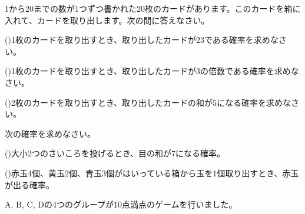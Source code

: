 \documentclass[
  12pt,a4paper,lualatex,ja=standard]{bxjsarticle}
\begin{document}
\begin{flushleft}
\vspace{10mm}

\vfill

\setcounter{skaunta}{0}

\noindent{} \hspace{1pt}1から20までの数が1つずつ書かれた20枚のカードがあります。このカードを箱に入れて、カードを取り出します。次の問に答えなさい。

()\hspace{2.5pt}1枚のカードを取り出すとき、取り出したカードが23である確率を求めなさい。

\vspace{10mm}

()\hspace{2.5pt}1枚のカードを取り出すとき、取り出したカードが3の倍数である確率を求めなさい。

\vspace{10mm}

()\hspace{2.5pt}2枚のカードを取り出すとき、取り出したカードの和が5になる確率を求めなさい。

\vspace{10mm}

\vfill

\setcounter{skaunta}{0}

\noindent{} \hspace{1pt}次の確率を求めなさい。

()\hspace{2.5pt}大小2つのさいころを投げるとき、目の和が7になる確率。

\vspace{10mm}

()\hspace{2.5pt}赤玉4個、黄玉2個、青玉3個がはいっている箱から玉を1個取り出すとき、赤玉が出る確率。

\vspace{10mm}

\vfill
\newpage

\setcounter{skaunta}{0}

\noindent{} \hspace{1pt}A, B, C, Dの4つのグループが10点満点のゲームを行いました。


\end{flushleft}
\end{document}

